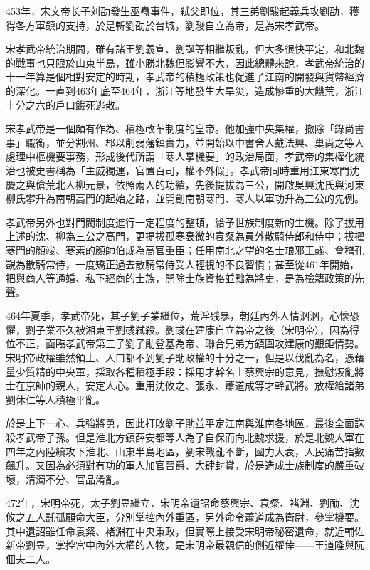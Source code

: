 453年，宋文帝长子刘劭發生巫蠱事件，弒父即位，其三弟劉駿起義兵攻劉劭，獲得各方軍鎮的支持，於是斬劉劭於台城，劉駿自立為帝，是為宋孝武帝。

宋孝武帝統治期間，雖有諸王劉義宣、劉誕等相繼叛亂，但大多很快平定，和北魏的戰事也只限於山東半島，雖小勝北魏但影響不大，因此總體來說，孝武帝統治的十一年算是個相對安定的時期，孝武帝的積極政策也促進了江南的開發與貨幣經濟的深化。一直到463年底至464年，浙江等地發生大旱災，造成慘重的大饑荒，浙江十分之六的戶口餓死逃散。

宋孝武帝是一個頗有作為、積極改革制度的皇帝。他加強中央集權，撤除「錄尚書事」職銜，並分割州、郡以削弱藩鎮實力，並開始以中書舍人戴法興、巢尚之等人處理中樞機要事務，形成後代所謂「寒人掌機要」的政治局面，孝武帝的集權化統治也被史書稱為「主威獨運，官置百司，權不外假」。孝武帝同時重用江東寒門沈慶之與傖荒北人柳元景，依照兩人的功績，先後提拔為三公，開啟吳興沈氏與河東柳氏攀升為南朝高門的起始之路，並開創南朝寒門、寒人以軍功升為三公的先例。

孝武帝另外也對門閥制度進行一定程度的整頓，給予世族制度新的生機。除了拔用上述的沈、柳為三公之高門，更提拔孤寒衰微的袁粲為員外散騎侍郎和侍中；拔擢寒門的顏竣、寒素的顏師伯成為高官重臣；任用南北之望的名士琅邪王彧、會稽孔覬為散騎常侍，一度矯正過去散騎常侍受人輕視的不良習慣；甚至從461年開始，把與商人等通婚、私下經商的士族，開除士族資格並黜為將吏，是為檢籍政策的先聲。

464年夏季，孝武帝死，其子劉子業繼位，荒淫残暴，朝廷內外人情汹汹，心懷恐懼，劉子業不久被湘東王劉彧弒殺。劉彧在建康自立為帝之後（宋明帝），因為得位不正，面臨孝武帝第三子劉子勛登基為帝、聯合兄弟方鎮圍攻建康的艱鉅情勢。宋明帝政權雖然領土、人口都不到劉子勛政權的十分之一，但是以伐亂為名，憑藉量少質精的中央軍，採取各種積極手段：採用才幹名士蔡興宗的意見，撫慰叛亂將士在京師的親人，安定人心。重用沈攸之、張永、蕭道成等才幹武將。放權給諸弟劉休仁等人積極平亂。

於是上下一心、兵強將勇，因此打敗劉子勛並平定江南與淮南各地區，最後全面誅殺孝武帝子孫。但是淮北方鎮薛安都等人為了自保而向北魏求援，於是北魏大軍在四年之內陸續攻下淮北、山東半島地區，劉宋戰亂不斷，國力大衰，人民痛苦指數飆升。又因為必須對有功的軍人加官晉爵、大肆封賞，於是造成士族制度的嚴重破壞，清濁不分、官品淆亂。

472年，宋明帝死，太子劉昱繼立，宋明帝遺詔命蔡興宗、袁粲、褚淵、劉勔、沈攸之五人託孤顧命大臣，分別掌控內外重區，另外命令蕭道成為衛尉，參掌機要。其中遺詔雖任命袁粲、褚淵在中央秉政，但實際上接受宋明帝秘密遺命，就近輔佐新帝劉昱，掌控宮中內外大權的人物，是宋明帝最親信的側近權倖——王道隆與阮佃夫二人。

